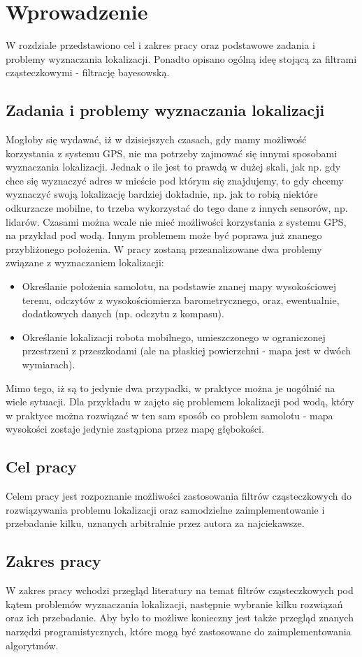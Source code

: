 \chapter{Wprowadzenie}
W rozdziale przedstawiono cel i zakres pracy oraz podstawowe zadania i problemy wyznaczania lokalizacji. Ponadto opisano ogólną ideę stojącą za filtrami cząsteczkowymi - filtrację bayesowską. 
\section{Zadania i problemy wyznaczania lokalizacji}
Mogłoby się wydawać, iż w dzisiejszych czasach, gdy mamy możliwość korzystania z systemu GPS, nie ma potrzeby zajmować się innymi sposobami wyznaczania lokalizacji. Jednak o ile jest to prawdą w dużej skali, jak np. gdy chce się wyznaczyć adres w mieście pod którym się znajdujemy, to gdy chcemy wyznaczyć swoją lokalizację bardziej dokładnie, np. jak to robią niektóre odkurzacze mobilne, to trzeba wykorzystać do tego dane z innych sensorów, np. lidarów. Czasami można wcale nie mieć możliwości korzystania z systemu GPS, na przykład pod wodą. Innym problemem może być poprawa już znanego przybliżonego położenia. W pracy zostaną przeanalizowane dwa problemy związane z wyznaczaniem lokalizacji:
\begin{itemize}
	\item Określanie położenia samolotu, na podstawie znanej mapy wysokościowej terenu, odczytów z wysokościomierza barometrycznego, oraz, ewentualnie, dodatkowych danych (np. odczytu z kompasu). 
	\item Określanie lokalizacji robota mobilnego, umieszczonego w ograniczonej przestrzeni z przeszkodami (ale na płaskiej powierzchni - mapa jest w dwóch wymiarach).
\end{itemize}
Mimo tego, iż są to jedynie dwa przypadki, w praktyce można je uogólnić na wiele sytuacji. Dla przykładu w \cite{underwater_pf} zajęto się problemem lokalizacji pod wodą, który w praktyce można rozwiązać w ten sam sposób co problem samolotu - mapa wysokości zostaje jedynie zastąpiona przez mapę głębokości.
\section{Cel pracy}
Celem pracy jest rozpoznanie możliwości zastosowania filtrów cząsteczkowych do rozwiązywania problemu lokalizacji oraz samodzielne zaimplementowanie i przebadanie kilku, uznanych arbitralnie przez autora za najciekawsze.
\section{Zakres pracy}
W zakres pracy wchodzi przegląd literatury na temat filtrów cząsteczkowych pod kątem problemów wyznaczania lokalizacji, następnie wybranie kilku rozwiązań oraz ich przebadanie. Aby było to możliwe konieczny jest także przegląd znanych narzędzi programistycznych, które mogą być zastosowane do zaimplementowania algorytmów.

